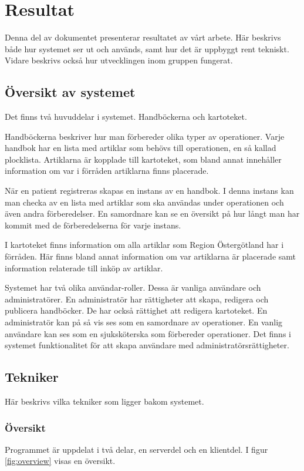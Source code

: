 \section{Resultat}
Denna del av dokumentet presenterar resultatet av vårt arbete.
Här beskrivs både hur systemet ser ut och används, samt hur det är uppbyggt rent tekniskt. Vidare beskrivs också hur utvecklingen inom gruppen fungerat.

\subsection{Översikt av systemet}
Det finns två huvuddelar i systemet. Handböckerna och kartoteket.

Handböckerna beskriver hur man förbereder olika typer av operationer.
Varje handbok har en lista med artiklar som behövs till operationen, en så kallad plocklista.
Artiklarna är kopplade till kartoteket, som bland annat innehåller information om var i förråden artiklarna finns placerade.

När en patient registreras skapas en instans av en handbok.
I denna instans kan man checka av en lista med artiklar som ska användas under operationen och även andra förberedelser.
En samordnare kan se en översikt på hur långt man har kommit med de förberedelserna för varje instans.

I kartoteket finns information om alla artiklar som Region Östergötland har i förråden.
Här finns bland annat information om var artiklarna är placerade samt information relaterade till inköp av artiklar.

Systemet har två olika användar-roller. Dessa är vanliga användare och administratörer. En administratör har rättigheter att skapa, redigera och publicera handböcker. De har också rättighet att redigera kartoteket. En administratör kan på så vis ses som en samordnare av operationer. En vanlig användare kan ses som en sjuksköterska som förbereder operationer. Det finns i systemet funktionalitet för att skapa användare med administratörsrättigheter.

\subsection{Tekniker}
Här beskrivs vilka tekniker som ligger bakom systemet.

\subsubsection{Översikt}
Programmet är uppdelat i två delar, en serverdel och en klientdel. I figur \ref{fig:overview} visas en översikt.


